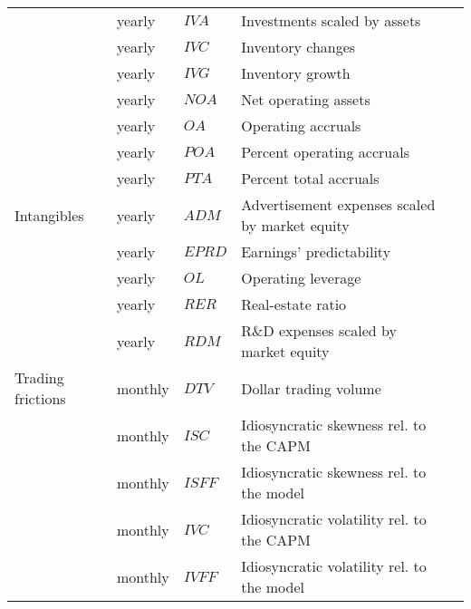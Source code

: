 \begin{landscape}
\begin{ThreePartTable}
\begin{center}
\begin{footnotesize}
\begin{longtabu}{l l l l l}
						\rule{0pt}{3ex}
						 & yearly & $IVA$ & Investments scaled by assets & \cite{ly/su/zh/2008} \\
						 \rule{0pt}{3ex}
						 & yearly & $IVC$ & Inventory changes & \cite{th/zh/2002} \\
						 \rule{0pt}{3ex}
						 & yearly & $IVG$ & Inventory growth & \cite{be/li/2012} \\
						 \rule{0pt}{3ex}
						 & yearly & $NOA$ & Net operating assets & \cite{hi/ho/te/zh/2004} \\
						 \rule{0pt}{3ex}
						 & yearly & $OA$ & Operating accruals & \cite{sl/1996} \\
						 \rule{0pt}{3ex}
						 & yearly & $POA$ & Percent operating accruals & \cite{ha/lu/va/2011} \\
						 \rule{0pt}{3ex}
						 & yearly & $PTA$ & Percent total accruals & \cite{ha/lu/va/2011} \\
						 \hline 
						\rule{0pt}{3ex}
						Intangibles & yearly & $ADM$ & Advertisement expenses scaled by market equity & \cite{ch/la/so/2001} \\
                      \rule{0pt}{3ex}
						 & yearly & $EPRD$ & Earnings' predictability & \cite{fr/la/ol/sc/2004} \\
						\rule{0pt}{3ex}
						 & yearly & $OL$ & Operating leverage & \cite{no/2011} \\
                      \rule{0pt}{3ex}
						 & yearly & $RER$ & Real-estate ratio & \cite{tu/2010} \\
						 \rule{0pt}{3ex}
						 & yearly & $RDM$ & R\&D expenses scaled by market equity & \cite{ch/la/so/2001} \\
						 \hline 
						 \rule{0pt}{3ex}
						 Trading frictions & monthly & $DTV$  & Dollar trading volume  & \cite{br/ch/su/1998} \\
                      \rule{0pt}{3ex}
						 & monthly & $ISC$  & Idiosyncratic skewness rel. to the CAPM & \cite{ba/en/mu/2016} \\
                      \rule{0pt}{3ex}
						 & monthly & $ISFF$  & Idiosyncratic skewness rel. to the \cite{fa/fr/1993} model & \cite{ba/en/mu/2016} \\
                      \rule{0pt}{3ex}
						 & monthly & $IVC$  & Idiosyncratic volatility rel. to the CAPM & \cite{an/ho/xi/zh/2006} \\
                      \rule{0pt}{3ex}
						 & monthly & $IVFF$  & Idiosyncratic volatility rel. to the \cite{fa/fr/1993} model & \cite{an/ho/xi/zh/2006} \\
						\bottomrule
					\end{longtabu}
				\end{footnotesize}
			\end{center}
		\end{ThreePartTable}
	
	\end{landscape}
	
	
